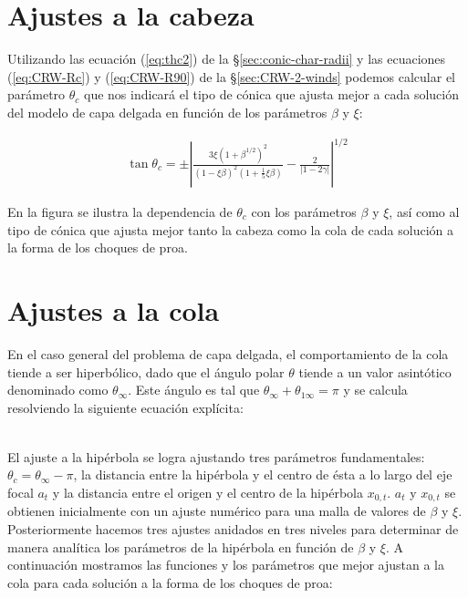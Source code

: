 \section{Ajustes a la cabeza}

Utilizando las ecuación (\ref{eq:thc2})  de la \S \ref{sec:conic-char-radii} y las ecuaciones
(\ref{eq:CRW-Rc}) y (\ref{eq:CRW-R90}) de la \S \ref{sec:CRW-2-winds} podemos calcular el parámetro
$\theta_c$ que nos indicará el tipo de cónica que ajusta mejor a cada solución del modelo de capa delgada
en función de los parámetros $\beta$ y $\xi$: 

 \begin{align}
   \tan\theta_c = \pm\left|\frac{3\xi\left(1 + \beta^{1/2}\right)^2}{\left(1 - \xi\beta\right)^2
   \left(1 + \frac{1}{5}\xi\beta\right)} - \frac{2}{\left|1 - 2\gamma\right|}\right|^{1/2}
 \end{align}

 En la figura  se ilustra la dependencia de $\theta_c$ con los parámetros $\beta$ y $\xi$, así como al tipo de
 cónica que ajusta mejor tanto la cabeza como la cola de cada solución a la forma de los choques de proa.
 
 \section{Ajustes a la cola}
\label{sec:tail-fit}
 En el caso general del problema de capa delgada, el comportamiento de la cola tiende a ser hiperbólico, dado que
 el ángulo polar $\theta$ tiende a un valor asintótico denominado como $\theta_\infty$. Este ángulo es tal que
 $\theta_\infty + \theta_{1\infty} = \pi$ y se calcula resolviendo la siguiente ecuación explícita:

 \begin{align}
   
 \end{align}

 El ajuste a la hipérbola se logra ajustando tres parámetros fundamentales: $\theta_c = \theta_\infty - \pi$, la distancia entre la hipérbola y el centro de ésta a lo largo del eje focal $a_t$ y la distancia entre el origen y el centro de la hipérbola $x_{0,t}$. $a_t$ y $x_{0,t}$ se obtienen inicialmente con un ajuste numérico para una malla de valores de $\beta$ y $\xi$. Posteriormente hacemos tres ajustes anidados en tres niveles para determinar de manera analítica los parámetros de la hipérbola en función de $\beta$ y $\xi$. A continuación mostramos las funciones y los parámetros que mejor ajustan a la cola para cada solución a la forma de los choques de proa:


